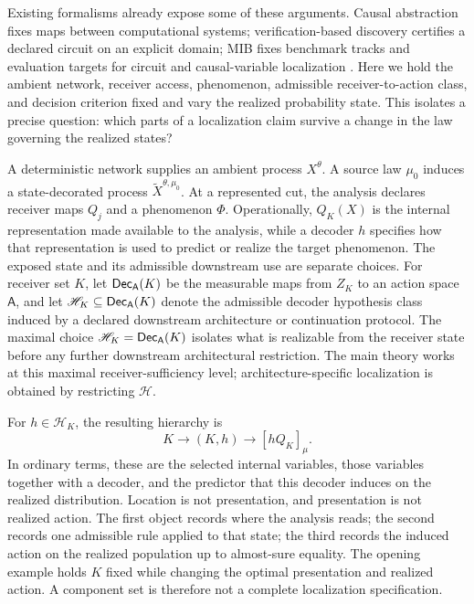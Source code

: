 Existing formalisms already expose some of these arguments. Causal abstraction fixes maps between computational systems; verification-based discovery certifies a declared circuit on an explicit domain; MIB fixes benchmark tracks and evaluation targets for circuit and causal-variable localization \citep{geiger2025causal,hadad2026formal,mueller2025mib}. Here we hold the ambient network, receiver access, phenomenon, admissible receiver-to-action class, and decision criterion fixed and vary the realized probability state. This isolates a precise question: which parts of a localization claim survive a change in the law governing the realized states?

A deterministic network supplies an ambient process $X^\theta$. A source law $\mu_0$ induces a state-decorated process $\widetilde X^{\theta,\mu_0}$. At a represented cut, the analysis declares receiver maps $Q_j$ and a phenomenon $\Phi$. Operationally, $Q_K(X)$ is the internal representation made available to the analysis, while a decoder $h$ specifies how that representation is used to predict or realize the target phenomenon. The exposed state and its admissible downstream use are separate choices. For receiver set $K$, let $\mathsf{Dec}_{\mathsf A}(K)$ be the measurable maps from $Z_K$ to an action space $\mathsf A$, and let $\mathscr H_K\subseteq\mathsf{Dec}_{\mathsf A}(K)$ denote the admissible decoder hypothesis class induced by a declared downstream architecture or continuation protocol. The maximal choice $\mathscr H_K=\mathsf{Dec}_{\mathsf A}(K)$ isolates what is realizable from the receiver state before any further downstream architectural restriction. The main theory works at this maximal receiver-sufficiency level; architecture-specific localization is obtained by restricting $\mathscr H$.

For $h\in\mathscr H_K$, the resulting hierarchy is
\begin{equation}
\boxed{
K\longrightarrow (K,h)\longrightarrow [hQ_K]_\mu .
}
\label{eq:intro-hierarchy}
\end{equation}
In ordinary terms, these are the selected internal variables, those variables together with a decoder, and the predictor that this decoder induces on the realized distribution. Location is not presentation, and presentation is not realized action. The first object records where the analysis reads; the second records one admissible rule applied to that state; the third records the induced action on the realized population up to almost-sure equality. The opening example holds $K$ fixed while changing the optimal presentation and realized action. A component set is therefore not a complete localization specification.

